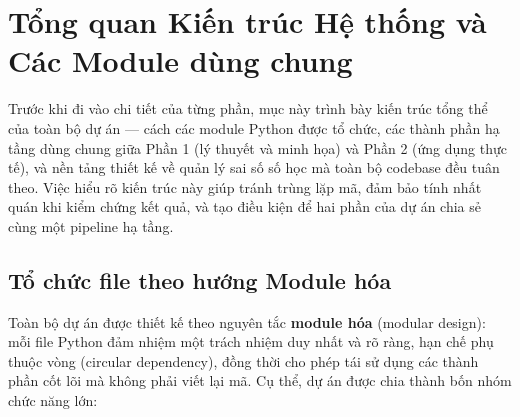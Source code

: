 \section{Tổng quan Kiến trúc Hệ thống và Các Module dùng chung}

Trước khi đi vào chi tiết của từng phần, mục này trình bày kiến trúc tổng thể của toàn bộ dự án --- cách các module Python được tổ chức, các thành phần hạ tầng dùng chung giữa Phần 1 (lý thuyết và minh họa) và Phần 2 (ứng dụng thực tế), và nền tảng thiết kế về quản lý sai số số học mà toàn bộ codebase đều tuân theo. Việc hiểu rõ kiến trúc này giúp tránh trùng lặp mã, đảm bảo tính nhất quán khi kiểm chứng kết quả, và tạo điều kiện để hai phần của dự án chia sẻ cùng một pipeline hạ tầng.

\subsection{Tổ chức file theo hướng Module hóa}

Toàn bộ dự án được thiết kế theo nguyên tắc \textbf{module hóa} (modular design): mỗi file Python đảm nhiệm một trách nhiệm duy nhất và rõ ràng, hạn chế phụ thuộc vòng (circular dependency), đồng thời cho phép tái sử dụng các thành phần cốt lõi mà không phải viết lại mã. Cụ thể, dự án được chia thành bốn nhóm chức năng lớn:

